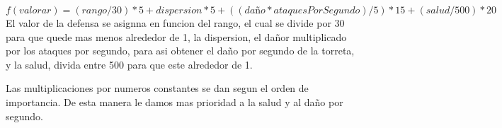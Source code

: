 
$$ f(valorar)=(rango/30)*5+dispersion*5+((daño*ataquesPorSegundo)/5)*15+(salud/500)*20$$
El valor de la defensa se asignna en funcion del rango, el cual se divide por 30 para que quede mas menos alrededor de 1, la dispersion, el dañor multiplicado por los ataques por segundo, para asi obtener el daño por segundo de la torreta, y la salud, divida entre 500 para que este alrededor de 1.

Las multiplicaciones por numeros constantes se dan segun el orden de importancia. De esta manera le damos mas prioridad a la salud y al daño por segundo.
